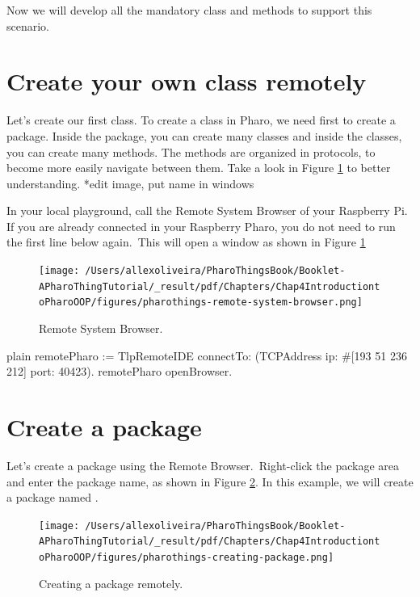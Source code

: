 \documentclass[10pt,twoside,english]{_support/latex/sbabook/sbabook}
\begin{document}
Now we will develop all the mandatory class and methods to support this scenario.
\section{Create your own class remotely}
Let's create our first class. To create a class in Pharo, we need first to create a package. Inside the package, you can create many classes and inside the classes, you can create many methods. The methods are organized in protocols, to become more easily navigate between them. Take a look in Figure \ref{RemoteBrowser} to better understanding. *edit image, put name in windows

In your local playground, call the Remote System Browser of your Raspberry Pi. If you are already connected in your Raspberry Pharo, you do not need to run the first line below again. This will open a window as shown in Figure \ref{RemoteBrowser} 


\begin{figure}

\begin{center}
\texttt{[image: /Users/allexoliveira/PharoThingsBook/Booklet-APharoThingTutorial/\_result/pdf/Chapters/Chap4IntroductiontoPharoOOP/figures/pharothings-remote-system-browser.png]}\caption{Remote System Browser.\label{RemoteBrowser}}\end{center}
\end{figure}


\begin{displaycode}{plain}
remotePharo := TlpRemoteIDE connectTo: (TCPAddress ip: #[193 51 236 212] port: 40423).
remotePharo openBrowser.
\end{displaycode}
\section{Create a package}
Let's create a package using the Remote Browser. Right-click the package area and enter the package name, as shown in Figure \ref{CreatingPackage}. In this example, we will create a package named .


\begin{figure}

\begin{center}
\texttt{[image: /Users/allexoliveira/PharoThingsBook/Booklet-APharoThingTutorial/\_result/pdf/Chapters/Chap4IntroductiontoPharoOOP/figures/pharothings-creating-package.png]}\caption{Creating a package remotely.\label{CreatingPackage}}\end{center}
\end{figure}
\end{document}
